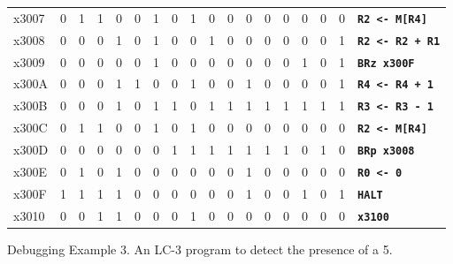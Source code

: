 \documentclass{patt}
\begin{document}
\begin{figure}
\begin{minipage}{36pc}
\begin{center}
\begin{tabular}{@{}l c c c c c c c c c c c c c c c c l }
\cline{2-17}
x3007 & \multicolumn{1}{|c}{0} & 1 & 1 & \multicolumn{1}{c|}{0} & 0 & 1 & \multicolumn{1}{c|}{0} & 1 & 0 & \multicolumn{1}{c|}{0} & 0 & 0 & 0 & 0 & 0 & \multicolumn{1}{c|}{0} & \multicolumn{1}{l}{\tt\bfseries R2 <- M[R4]}\\
\cline{2-17}
x3008 & \multicolumn{1}{|c}{0} & 0 & 0 & \multicolumn{1}{c|}{1} & 0 & 1 & \multicolumn{1}{c|}{0} & 0 & 1 & \multicolumn{1}{c|}{0} & \multicolumn{1}{c|}{0} & 0 & \multicolumn{1}{c|}{0} & 0 & 0 & \multicolumn{1}{c|}{1} & \multicolumn{1}{l}{\tt\bfseries R2 <- R2 + R1}\\
\cline{2-17}
x3009 & \multicolumn{1}{|c}{0} & 0 & 0 & \multicolumn{1}{c|}{0} & 0 & 1 & \multicolumn{1}{c|}{0} & 0 & 0 & 0 & 0 & 0 & 0 & 1 & 0 & \multicolumn{1}{c|}{1} & \multicolumn{1}{l}{\tt\bfseries BRz x300F}\\
\cline{2-17}
x300A & \multicolumn{1}{|c}{0} & 0 & 0 & \multicolumn{1}{c|}{1} & 1 & 0 & \multicolumn{1}{c|}{0} & 1 & 0 & \multicolumn{1}{c|}{0} & \multicolumn{1}{c|}{1} & 0 & 0 & 0 & 0 & \multicolumn{1}{c|}{1} & \multicolumn{1}{l}{\tt\bfseries R4 <- R4 + 1}\\
\cline{2-17}
x300B & \multicolumn{1}{|c}{0} & 0 & 0 & \multicolumn{1}{c|}{1} & 0 & 1 & \multicolumn{1}{c|}{1} & 0 & 1 & \multicolumn{1}{c|}{1} & \multicolumn{1}{c|}{1} & 1 & 1 & 1 & 1 & \multicolumn{1}{c|}{1} & \multicolumn{1}{l}{\tt\bfseries R3 <- R3 - 1}\\
\cline{2-17}
x300C & \multicolumn{1}{|c}{0} & 1 & 1 & \multicolumn{1}{c|}{0} & 0 & 1 & \multicolumn{1}{c|}{0} & 1 & 0 & \multicolumn{1}{c|}{0} & 0 & 0 & 0 & 0 & 0 & \multicolumn{1}{c|}{0} & \multicolumn{1}{l}{\tt\bfseries R2 <- M[R4]}\\
\cline{2-17}
x300D & \multicolumn{1}{|c}{0} & 0 & 0 & \multicolumn{1}{c|}{0} & 0 & 0 & \multicolumn{1}{c|}{1} & 1 & 1 & 1 & 1 & 1 & 1 & 0 & 1 & \multicolumn{1}{c|}{0} & \multicolumn{1}{l}{\tt\bfseries BRp x3008}\\
\cline{2-17}
x300E & \multicolumn{1}{|c}{0} & 1 & 0 & \multicolumn{1}{c|}{1} & 0 & 0 & \multicolumn{1}{c|}{0} & 0 & 0 & \multicolumn{1}{c|}{0} & \multicolumn{1}{c|}{1} & 0 & 0 & 0 & 0 & \multicolumn{1}{c|}{0} & \multicolumn{1}{l}{\tt\bfseries R0 <- 0}\\
\cline{2-17}
x300F & \multicolumn{1}{|c}{1} & 1 & 1 & \multicolumn{1}{c|}{1} & 0 & 0 & 0 & \multicolumn{1}{c|}{0} & 0 & 0 & 1 & 0 & 0 & 1 & 0 & \multicolumn{1}{c|}{1} & \multicolumn{1}{l}{\tt\bfseries HALT}\\
\cline{2-17}
x3010 & \multicolumn{1}{|c}{0} & 0 & 1 & 1 & 0 & 0 & 0 & 1 & 0 & 0 & 0 & 0 & 0 & 0 & 0 & \multicolumn{1}{c|}{0} & \multicolumn{1}{l}{\tt\bfseries x3100}\\
\cline{2-17}
\end{tabular}
\end{center}
\caption{Debugging Example 3.  An LC-3 program to detect the presence of a 5.}
\end{minipage}
\end{figure}
\end{document}

